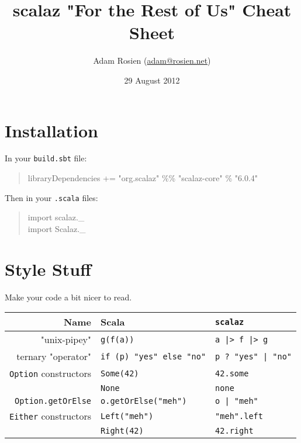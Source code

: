 \documentclass{tufte-handout}
\title{scalaz "For the Rest of Us" Cheat Sheet}
\author[Adam Rosien]{Adam Rosien (\href{mailto:adam@rosien.net}{adam@rosien.net})}
\date{29 August 2012}  %
\begin{document}
\maketitle%


\section{Installation}\label{sec:installation}

In your \texttt{build.sbt} file:

\begin{fullwidth}
\begin{quote}
  \ttfamily
   libraryDependencies += "org.scalaz" \%\% "scalaz-core" \% "6.0.4"
\end{quote}
\end{fullwidth}

\noindent Then in your \texttt{.scala} files: 

\begin{quote}
  \ttfamily import scalaz.\_\\
  import Scalaz.\_
\end{quote}

\section{Style Stuff}\label{sec:style}

Make your code a bit nicer to read.

\begin{table}[ht]
  \centering
  \selectfont
  \begin{tabular}{rll}
    \toprule
    Name & Scala & \texttt{scalaz} \\
    \midrule
    "unix-pipey"& \texttt{g(f(a))} & \texttt{a |> f |> g}  \\
    ternary "operator" & \texttt{if (p) "yes" else "no"} & \texttt{p ? "yes" | "no"} \\
    \texttt{Option} constructors & \texttt{Some(42)} & \texttt{42.some} \\
                                   & \texttt{None} & \texttt{none} \\
    \texttt{Option.getOrElse} & \texttt{o.getOrElse("meh")} & \texttt{o | "meh"} \\
    \texttt{Either} constructors & \texttt{Left("meh")} & \texttt{"meh".left} \\
                                  & \texttt{Right(42)} & \texttt{42.right} \\
    \bottomrule
  \end{tabular}
  \label{tab:normaltab}
\end{table}
\end{document}

